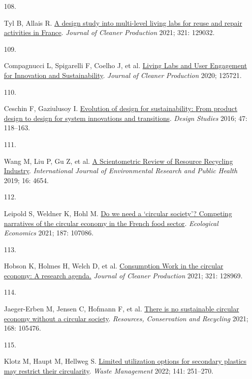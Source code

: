 \documentclass[
  12pt,
  a4paperpaper,
  onecolumn]{article}
\newlength{\cslhangindent}
\newlength{\csllabelwidth}
\newlength{\cslentryspacingunit} %
\newenvironment{CSLReferences}[2] %
 {%
  \setlength{\parindent}{0pt}
  \ifodd #1
  \let\oldpar\par
  \def\par{\hangindent=\cslhangindent\oldpar}
  \fi
  \setlength{\parskip}{#2\cslentryspacingunit}
 }%
 {}
\newcommand{\CSLLeftMargin}[1]{\parbox[t]{\csllabelwidth}{#1}}
\newcommand{\CSLRightInline}[1]{\parbox[t]{\linewidth - \csllabelwidth}{#1}\break}
\begin{document}
\begin{CSLReferences}{0}{0}
\leavevmode{}%
\CSLLeftMargin{108. }%
\CSLRightInline{Tyl B, Allais R.
\href{https://doi.org/10.1016/J.JCLEPRO.2021.129032}{A design study into
multi-level living labs for reuse and repair activities in {France}}.
\emph{Journal of Cleaner Production} 2021; 321: 129032.}

\leavevmode{}%
\CSLLeftMargin{109. }%
\CSLRightInline{Compagnucci L, Spigarelli F, Coelho J, et al.
\href{https://doi.org/10.1016/j.jclepro.2020.125721}{Living {Labs} and
{User Engagement} for {Innovation} and {Sustainability}}. \emph{Journal
of Cleaner Production} 2020; 125721.}

\leavevmode{}%
\CSLLeftMargin{110. }%
\CSLRightInline{Ceschin F, Gaziulusoy I.
\href{https://doi.org/10.1016/j.destud.2016.09.002}{Evolution of design
for sustainability: {From} product design to design for system
innovations and transitions}. \emph{Design Studies} 2016; 47: 118--163.}

\leavevmode{}%
\CSLLeftMargin{111. }%
\CSLRightInline{Wang M, Liu P, Gu Z, et al.
\href{https://doi.org/10.3390/ijerph16234654}{A {Scientometric Review}
of {Resource Recycling Industry}}. \emph{International Journal of
Environmental Research and Public Health} 2019; 16: 4654.}

\leavevmode{}%
\CSLLeftMargin{112. }%
\CSLRightInline{Leipold S, Weldner K, Hohl M.
\href{https://doi.org/10.1016/j.ecolecon.2021.107086}{Do we need a
{`circular society'}? {Competing} narratives of the circular economy in
the {French} food sector}. \emph{Ecological Economics} 2021; 187:
107086.}

\leavevmode{}%
\CSLLeftMargin{113. }%
\CSLRightInline{Hobson K, Holmes H, Welch D, et al.
\href{https://doi.org/10.1016/J.JCLEPRO.2021.128969}{Consumption {Work}
in the circular economy: {A} research agenda.} \emph{Journal of Cleaner
Production} 2021; 321: 128969.}

\leavevmode{}%
\CSLLeftMargin{114. }%
\CSLRightInline{Jaeger-Erben M, Jensen C, Hofmann F, et al.
\href{https://doi.org/10.1016/j.resconrec.2021.105476}{There is no
sustainable circular economy without a circular society}.
\emph{Resources, Conservation and Recycling} 2021; 168: 105476.}

\leavevmode{}%
\CSLLeftMargin{115. }%
\CSLRightInline{Klotz M, Haupt M, Hellweg S.
\href{https://doi.org/10.1016/J.WASMAN.2022.01.002}{Limited utilization
options for secondary plastics may restrict their circularity}.
\emph{Waste Management} 2022; 141: 251--270.}


\end{CSLReferences}
\end{document}
